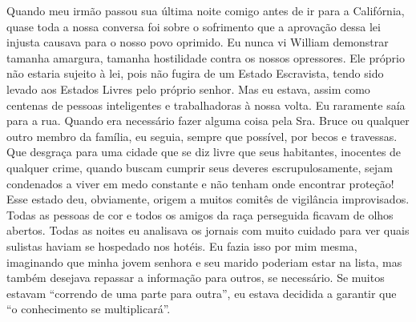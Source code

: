 Quando meu irmão passou sua última
noite comigo antes de ir para a Califórnia, quase toda a nossa conversa
foi sobre o sofrimento que a aprovação dessa lei injusta causava para o
nosso povo oprimido. Eu nunca vi William demonstrar tamanha amargura,
tamanha hostilidade contra os nossos opressores. Ele próprio não estaria
sujeito à lei, pois não fugira de um Estado Escravista, tendo sido
levado aos Estados Livres pelo próprio senhor. Mas eu estava, assim como
centenas de pessoas inteligentes e trabalhadoras à nossa volta. Eu
raramente saía para a rua. Quando era necessário fazer alguma coisa pela
Sra. Bruce ou qualquer outro membro da família, eu seguia, sempre que
possível, por becos e travessas. Que desgraça para uma cidade que se diz
livre que seus habitantes, inocentes de qualquer crime, quando buscam
cumprir seus deveres escrupulosamente, sejam condenados a viver em medo
constante e não tenham onde encontrar proteção! Esse estado deu,
obviamente, origem a muitos comitês de vigilância improvisados. Todas as
pessoas de cor e todos os amigos da raça perseguida ficavam de olhos
abertos. Todas as noites eu analisava os jornais com muito cuidado para
ver quais sulistas haviam se hospedado nos hotéis. Eu fazia isso por mim
mesma, imaginando que minha jovem senhora e seu marido poderiam estar na
lista, mas também desejava repassar a informação para outros, se
necessário. Se muitos estavam ``correndo de uma parte para outra'', eu
estava decidida a garantir que ``o conhecimento se multiplicará''.

